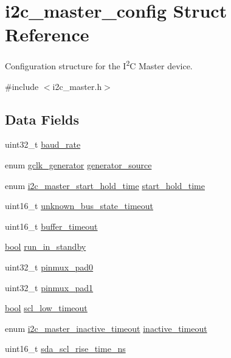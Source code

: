 \hypertarget{structi2c__master__config}{}\section{i2c\+\_\+master\+\_\+config Struct Reference}
\label{structi2c__master__config}


Configuration structure for the I\textsuperscript{2}C Master device.  




{\ttfamily \#include $<$i2c\+\_\+master.\+h$>$}

\subsection*{Data Fields}
\begin{DoxyCompactItemize}
\item 
uint32\+\_\+t \mbox{\hyperlink{structi2c__master__config_a148f33bbcda8087a77d8ba30f7e3c502}{baud\+\_\+rate}}
\item 
enum \mbox{\hyperlink{group__asfdoc__sam0__system__clock__group_ga1ab9bb87560ad127ed982591b7d67311}{gclk\+\_\+generator}} \mbox{\hyperlink{structi2c__master__config_a2dba667c6d06bff254b7284d45dd02a3}{generator\+\_\+source}}
\item 
enum \mbox{\hyperlink{group__asfdoc__sam0__sercom__i2c__group_gadd8aa7cabbddc1cd2c1a8753c9b99d20}{i2c\+\_\+master\+\_\+start\+\_\+hold\+\_\+time}} \mbox{\hyperlink{structi2c__master__config_a2ae2ec272b3ad065b0140b17d490f377}{start\+\_\+hold\+\_\+time}}
\item 
uint16\+\_\+t \mbox{\hyperlink{structi2c__master__config_ae1dc34ce71ac470c5f24c79bcd8d48e5}{unknown\+\_\+bus\+\_\+state\+\_\+timeout}}
\item 
uint16\+\_\+t \mbox{\hyperlink{structi2c__master__config_a749c4f56b937e974dba38373c822eb5e}{buffer\+\_\+timeout}}
\item 
\mbox{\hyperlink{group__group__sam0__utils_ga97a80ca1602ebf2303258971a2c938e2}{bool}} \mbox{\hyperlink{structi2c__master__config_a514964d5c2a8da4dd96bac82a53477f2}{run\+\_\+in\+\_\+standby}}
\item 
uint32\+\_\+t \mbox{\hyperlink{structi2c__master__config_a36c58e420cf9b44d2f6cc8042f81b5d6}{pinmux\+\_\+pad0}}
\item 
uint32\+\_\+t \mbox{\hyperlink{structi2c__master__config_acbc2a9a6d4bee7422a98b6af97e470dc}{pinmux\+\_\+pad1}}
\item 
\mbox{\hyperlink{group__group__sam0__utils_ga97a80ca1602ebf2303258971a2c938e2}{bool}} \mbox{\hyperlink{structi2c__master__config_ab883785fee7f9079044bdadfe5db9bb9}{scl\+\_\+low\+\_\+timeout}}
\item 
enum \mbox{\hyperlink{group__asfdoc__sam0__sercom__i2c__group_ga4640bee224bf835f4c38d7702be0742c}{i2c\+\_\+master\+\_\+inactive\+\_\+timeout}} \mbox{\hyperlink{structi2c__master__config_a2ae1421dca42cc4de5731813c07ba7df}{inactive\+\_\+timeout}}
\item 
uint16\+\_\+t \mbox{\hyperlink{structi2c__master__config_ac3462c504b169ba16990f2a14fcd7064}{sda\+\_\+scl\+\_\+rise\+\_\+time\+\_\+ns}}
\end{DoxyCompactItemize}


